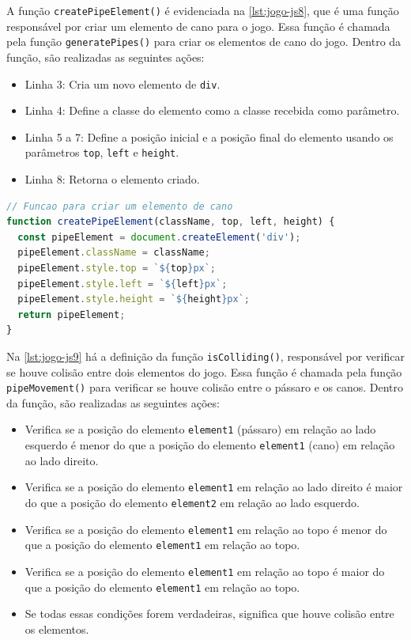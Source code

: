 A função \texttt{createPipeElement()} é evidenciada na \autoref{lst:jogo-js8}, que é uma função responsável por criar um elemento de cano para o jogo. Essa função é chamada pela função \texttt{generatePipes()} para criar os elementos de cano do jogo. Dentro da função, são realizadas as seguintes ações:
\begin{itemize}
    \item Linha 3: Cria um novo elemento de \texttt{div}.

    \item Linha 4: Define a classe do elemento como a classe recebida como parâmetro.

    \item Linha 5 a 7: Define a posição inicial e a posição final do elemento usando os parâmetros \texttt{top}, \texttt{left} e \texttt{height}.

    \item Linha 8: Retorna o elemento criado.
\end{itemize}

\newpage

\begin{lstlisting}[language=TypeScript, caption={Projeto exemplo em JS (Parte 8): Função de criação de canos}, label=lst:jogo-js8]
// Funcao para criar um elemento de cano
function createPipeElement(className, top, left, height) {
  const pipeElement = document.createElement('div');
  pipeElement.className = className;
  pipeElement.style.top = `${top}px`;
  pipeElement.style.left = `${left}px`;
  pipeElement.style.height = `${height}px`;
  return pipeElement;
}
\end{lstlisting}


Na \autoref{lst:jogo-js9} há a definição da função \texttt{isColliding()}, responsável por verificar se houve colisão entre dois elementos do jogo. Essa função é chamada pela função \texttt{pipeMovement()} para verificar se houve colisão entre o pássaro e os canos. Dentro da função, são realizadas as seguintes ações:
\begin{itemize}
    \item Verifica se a posição do elemento \texttt{element1} (pássaro) em relação ao lado esquerdo é menor do que a posição do elemento \texttt{element1} (cano) em relação ao lado direito.

    \item Verifica se a posição do elemento \texttt{element1} em relação ao lado direito é maior do que a posição do elemento \texttt{element2} em relação ao lado esquerdo.

    \item Verifica se a posição do elemento \texttt{element1} em relação ao topo é menor do que a posição do elemento \texttt{element1} em relação ao topo.
    
    \item Verifica se a posição do elemento \texttt{element1} em relação ao topo é maior do que a posição do elemento \texttt{element1} em relação ao topo.

    \item Se todas essas condições forem verdadeiras, significa que houve colisão entre os elementos.
\end{itemize}


